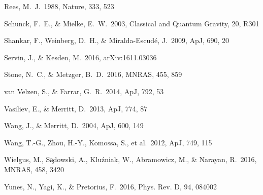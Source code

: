 \documentclass[useAMS,usenatbib]{mn2e}
\def\apj{{ ApJ}}
\def\mnras{{ MNRAS}}
\def\nat {{ Nature}}
\def\prd{{ Phys. Rev. D}}
\begin{document}
\begin{thebibliography}{}
 Rees, M.~J.\ 1988, \nat,
  333, 523

 Schunck, F.~E.,
  \& Mielke, E.~W.\ 2003, Classical and Quantum Gravity, 20, R301

 Shankar, F.,
  Weinberg, D.~H., \& Miralda-Escud{\'e}, J.\ 2009, \apj, 690, 20 

 Servin, J., \&
  Kesden, M.\ 2016, arXiv:1611.03036 


 Stone, N.~C., \& Metzger,
B.~D.\ 2016, \mnras, 455, 859 



 van Velzen, S., \& Farrar,
G.~R.\ 2014, \apj, 792, 53 


 Vasiliev, E.,
  \& Merritt, D.\ 2013, \apj, 774, 87 

 Wang, J., \& Merritt, D.\ 2004,
\apj, 600, 149 

 Wang, T.-G., Zhou, H.-Y., 
Komossa, S., et al.\ 2012, \apj, 749, 115 

 Wielgus, M., S{\c
    a}dowski, A., Klu{\'z}niak, W., Abramowicz, M., \& Narayan, R.\
  2016, \mnras, 458, 3420  

 Yunes, N., Yagi, K.,
  \& Pretorius, F.\ 2016, \prd, 94, 084002 


\end{thebibliography}
\end{document}
